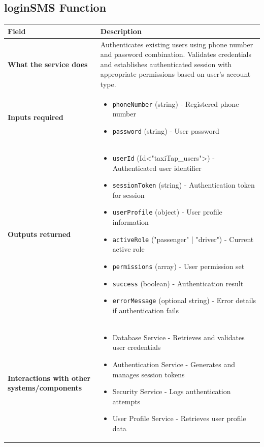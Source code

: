 \documentclass[11pt,a4paper]{article}
\begin{document}
\subsection{loginSMS Function}

\begin{longtable}{|p{3cm}|p{12cm}|}
\hline
\textbf{Field} & \textbf{Description} \\
\hline
\textbf{What the service does} & 
Authenticates existing users using phone number and password combination. Validates credentials and establishes authenticated session with appropriate permissions based on user's account type. \\
\hline
\textbf{Inputs required} & 
\begin{itemize}[nosep]
\item \texttt{phoneNumber} (string) - Registered phone number
\item \texttt{password} (string) - User password
\end{itemize} \\
\hline
\textbf{Outputs returned} & 
\begin{itemize}[nosep]
\item \texttt{userId} (Id<"taxiTap\_users">) - Authenticated user identifier
\item \texttt{sessionToken} (string) - Authentication token for session
\item \texttt{userProfile} (object) - User profile information
\item \texttt{activeRole} ("passenger" | "driver") - Current active role
\item \texttt{permissions} (array) - User permission set
\item \texttt{success} (boolean) - Authentication result
\item \texttt{errorMessage} (optional string) - Error details if authentication fails
\end{itemize} \\
\hline
\textbf{Interactions with other systems/components} & 
\begin{itemize}[nosep]
\item Database Service - Retrieves and validates user credentials
\item Authentication Service - Generates and manages session tokens
\item Security Service - Logs authentication attempts
\item User Profile Service - Retrieves user profile data
\end{itemize} \\
\hline
\end{longtable}
\end{document}

